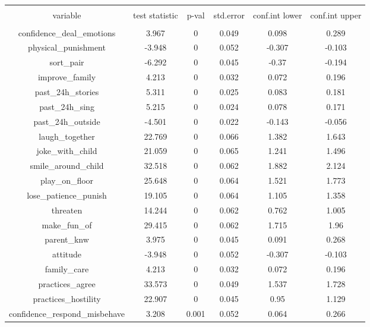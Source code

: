 
\begin{table}[!htbp] \centering 
  \caption{} 
  \label{tbl:country_baseline_constructs_imbalance} 
\begin{tabular}{@{\extracolsep{5pt}} cccccc} 
\\[-1.8ex]\hline 
\hline \\[-1.8ex] 
variable & test statistic & p-val & std.error & conf.int lower & conf.int upper \\ 
\hline \\[-1.8ex] 
confidence\_deal\_emotions & 3.967 & 0 & 0.049 & 0.098 & 0.289 \\ 
physical\_punishment & -3.948 & 0 & 0.052 & -0.307 & -0.103 \\ 
sort\_pair & -6.292 & 0 & 0.045 & -0.37 & -0.194 \\ 
improve\_family & 4.213 & 0 & 0.032 & 0.072 & 0.196 \\ 
past\_24h\_stories & 5.311 & 0 & 0.025 & 0.083 & 0.181 \\ 
past\_24h\_sing & 5.215 & 0 & 0.024 & 0.078 & 0.171 \\ 
past\_24h\_outside & -4.501 & 0 & 0.022 & -0.143 & -0.056 \\ 
laugh\_together & 22.769 & 0 & 0.066 & 1.382 & 1.643 \\ 
joke\_with\_child & 21.059 & 0 & 0.065 & 1.241 & 1.496 \\ 
smile\_around\_child & 32.518 & 0 & 0.062 & 1.882 & 2.124 \\ 
play\_on\_floor & 25.648 & 0 & 0.064 & 1.521 & 1.773 \\ 
lose\_patience\_punish & 19.105 & 0 & 0.064 & 1.105 & 1.358 \\ 
threaten & 14.244 & 0 & 0.062 & 0.762 & 1.005 \\ 
make\_fun\_of & 29.415 & 0 & 0.062 & 1.715 & 1.96 \\ 
parent\_knw & 3.975 & 0 & 0.045 & 0.091 & 0.268 \\ 
attitude & -3.948 & 0 & 0.052 & -0.307 & -0.103 \\ 
family\_care & 4.213 & 0 & 0.032 & 0.072 & 0.196 \\ 
practices\_agree & 33.573 & 0 & 0.049 & 1.537 & 1.728 \\ 
practices\_hostility & 22.907 & 0 & 0.045 & 0.95 & 1.129 \\ 
confidence\_respond\_misbehave & 3.208 & 0.001 & 0.052 & 0.064 & 0.266 \\ 

\end{tabular}
\end{table}
